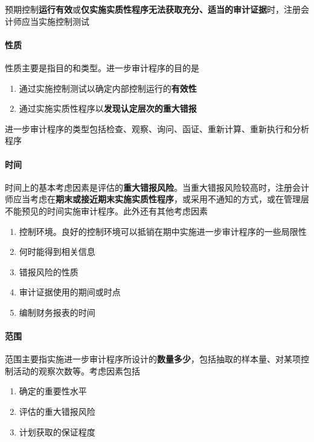 \documentclass[UTF8,12pt]{ctexart}
\numberwithin{equation}{section} %
\numberwithin{figure}{section}
\numberwithin{table}{section}
\begin{document}
	预期控制\textbf{运行有效}或\textbf{仅实施实质性程序无法获取充分、适当的审计证据}时，注册会计师应当实施控制测试
	
	\paragraph{性质}
	性质主要是指目的和类型。进一步审计程序的目的是
	\begin{enumerate}
		\item 通过实施控制测试以确定内部控制运行的\textbf{有效性}
		
		\item 通过实施实质性程序以\textbf{发现认定层次的重大错报}
	\end{enumerate}
	
	进一步审计程序的类型包括检查、观察、询问、函证、重新计算、重新执行和分析程序
	
	\paragraph{时间}
	时间上的基本考虑因素是评估的\textbf{重大错报风险}。当重大错报风险较高时，注册会计师应当考虑在\textbf{期末或接近期末实施实质性程序}，或采用不通知的方式，或在管理层不能预见的时间实施审计程序。此外还有其他考虑因素
	\begin{enumerate}
		\item 控制环境。良好的控制环境可以抵销在期中实施进一步审计程序的一些局限性
		
		\item 何时能得到相关信息
		
		\item 错报风险的性质
		
		\item 审计证据使用的期间或时点
		
		\item 编制财务报表的时间
	\end{enumerate}
	
	\paragraph{范围}
	范围主要指实施进一步审计程序所设计的\textbf{数量多少}，包括抽取的样本量、对某项控制活动的观察次数等。考虑因素包括
	\begin{enumerate}
		\item 确定的重要性水平
		
		\item 评估的重大错报风险
		
		\item 计划获取的保证程度
	\end{enumerate}
	
\end{document}
